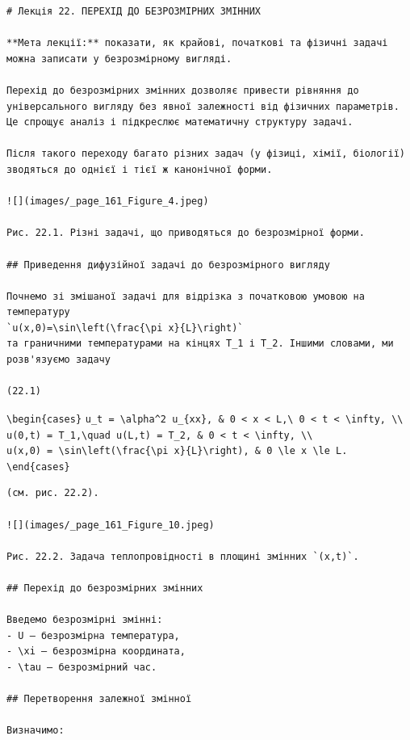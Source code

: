 \documentclass[
  ukrainian,
]{article}
\begin{document}
\begin{verbatim}
# Лекція 22. ПЕРЕХІД ДО БЕЗРОЗМІРНИХ ЗМІННИХ

**Мета лекції:** показати, як крайові, початкові та фізичні задачі можна записати у безрозмірному вигляді.

Перехід до безрозмірних змінних дозволяє привести рівняння до універсального вигляду без явної залежності від фізичних параметрів. Це спрощує аналіз і підкреслює математичну структуру задачі.

Після такого переходу багато різних задач (у фізиці, хімії, біології) зводяться до однієї і тієї ж канонічної форми.

![](images/_page_161_Figure_4.jpeg)

Рис. 22.1. Різні задачі, що приводяться до безрозмірної форми.

## Приведення дифузійної задачі до безрозмірного вигляду

Почнемо зі змішаної задачі для відрізка з початковою умовою на температуру  
`u(x,0)=\sin\left(\frac{\pi x}{L}\right)`  
та граничними температурами на кінцях T_1 і T_2. Іншими словами, ми розв'язуємо задачу

(22.1)
\end{verbatim}

\texttt{\textbackslash{}begin\{cases\}}
\texttt{u\_t\ =\ \textbackslash{}alpha\^{}2\ u\_\{xx\},\ \&\ 0\ \textless{}\ x\ \textless{}\ L,\textbackslash{}\ 0\ \textless{}\ t\ \textless{}\ \textbackslash{}infty,\ \textbackslash{}\textbackslash{}}
\texttt{u(0,t)\ =\ T\_1,\textbackslash{}quad\ u(L,t)\ =\ T\_2,\ \&\ 0\ \textless{}\ t\ \textless{}\ \textbackslash{}infty,\ \textbackslash{}\textbackslash{}}
\texttt{u(x,0)\ =\ \textbackslash{}sin\textbackslash{}left(\textbackslash{}frac\{\textbackslash{}pi\ x\}\{L\}\textbackslash{}right),\ \&\ 0\ \textbackslash{}le\ x\ \textbackslash{}le\ L.}
\texttt{\textbackslash{}end\{cases\}}

\begin{verbatim}
(см. рис. 22.2).

![](images/_page_161_Figure_10.jpeg)

Рис. 22.2. Задача теплопровідності в площині змінних `(x,t)`.

## Перехід до безрозмірних змінних

Введемо безрозмірні змінні:
- U — безрозмірна температура,
- \xi — безрозмірна координата,
- \tau — безрозмірний час.

## Перетворення залежної змінної

Визначимо:
\end{verbatim}
\end{document}
